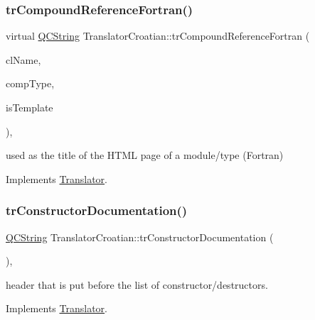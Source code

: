 \subsubsection{\texorpdfstring{trCompoundReferenceFortran()}{trCompoundReferenceFortran()}}
{\footnotesize\ttfamily virtual \mbox{\hyperlink{class_q_c_string}{Q\+C\+String}} Translator\+Croatian\+::tr\+Compound\+Reference\+Fortran (\begin{DoxyParamCaption}\item[{const char $\ast$}]{cl\+Name,  }\item[{\mbox{\hyperlink{class_class_def_ae70cf86d35fe954a94c566fbcfc87939}{Class\+Def\+::\+Compound\+Type}}}]{comp\+Type,  }\item[{bool}]{is\+Template }\end{DoxyParamCaption})\hspace{0.3cm}{\ttfamily [inline]}, {\ttfamily [virtual]}}

used as the title of the H\+T\+ML page of a module/type (Fortran) 

Implements \mbox{\hyperlink{class_translator}{Translator}}.

\mbox{\label{class_translator_croatian_a8dc880bee93a7c83e25afe263c61e3ec}} 
\subsubsection{\texorpdfstring{trConstructorDocumentation()}{trConstructorDocumentation()}}
{\footnotesize\ttfamily \mbox{\hyperlink{class_q_c_string}{Q\+C\+String}} Translator\+Croatian\+::tr\+Constructor\+Documentation (\begin{DoxyParamCaption}{ }\end{DoxyParamCaption})\hspace{0.3cm}{\ttfamily [inline]}, {\ttfamily [virtual]}}

header that is put before the list of constructor/destructors. 

Implements \mbox{\hyperlink{class_translator}{Translator}}.

\mbox{\label{class_translator_croatian_a3551539c8ac3b746f1c771870b984587}} 
